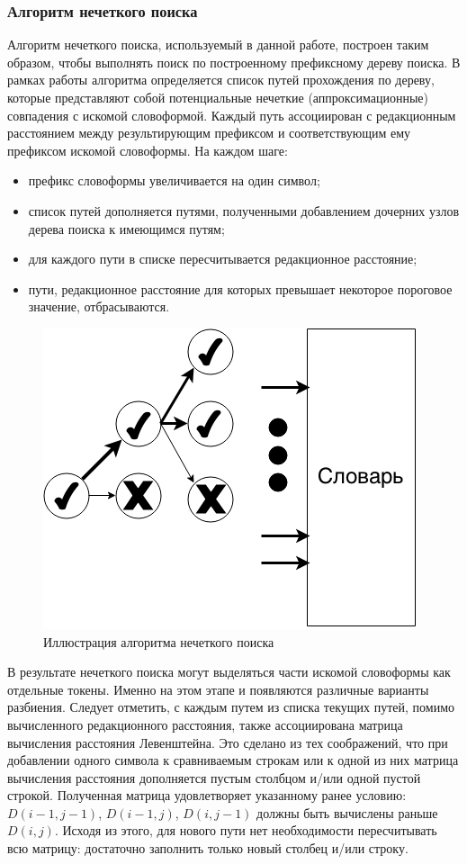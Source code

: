 \subsubsection{Алгоритм нечеткого поиска}
Алгоритм нечеткого поиска, используемый в данной работе, построен таким образом, чтобы выполнять поиск по построенному префиксному дереву поиска. В рамках работы алгоритма определяется список путей прохождения по дереву, которые представляют собой потенциальные нечеткие (аппроксимационные) совпадения с искомой словоформой. Каждый путь ассоциирован с редакционным расстоянием между результирующим префиксом и соответствующим ему префиксом искомой словоформы. На каждом шаге:
\begin{itemize}
	\item
	префикс словоформы увеличивается на один символ;
	\item
	список путей дополняется путями, полученными добавлением дочерних узлов дерева поиска к имеющимся путям;
	\item
	для каждого пути в списке пересчитывается редакционное расстояние;
	\item
	пути, редакционное расстояние для которых превышает некоторое пороговое значение, отбрасываются.
\end{itemize}
\begin{figure}[H]
	\centering
	\includegraphics[scale=0.6]{img/treesearch.png}
	\caption{Иллюстрация алгоритма нечеткого поиска}
\end{figure}
В результате нечеткого поиска могут выделяться части искомой словоформы как отдельные токены. Именно на этом этапе и появляются различные варианты разбиения. Следует отметить, с каждым путем из списка текущих путей, помимо вычисленного редакционного расстояния, также ассоциирована матрица вычисления расстояния Левенштейна. Это сделано из тех соображений, что при добавлении одного символа к сравниваемым строкам или к одной из них матрица вычисления расстояния дополняется пустым столбцом и/или одной пустой строкой. Полученная матрица удовлетворяет указанному ранее условию: \(D(i - 1, j - 1)\), \(D(i - 1, j)\), \(D(i, j - 1)\) должны быть вычислены раньше \(D(i, j)\). Исходя из этого, для нового пути нет необходимости пересчитывать всю матрицу: достаточно заполнить только новый столбец и/или строку.
